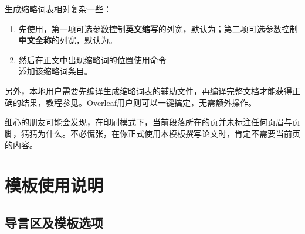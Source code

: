 \documentclass[print, promaster, vlined]{DissertUESTC}
\begin{document}
	
	
	\printnomenclature
	
	生成缩略词表相对复杂一些：
	\begin{enumerate}
		\item 先使用，第一项可选参数控制\textbf{英文缩写}的列宽，默认为\shad{5em}；第二项可选参数控制\textbf{中文全称}的列宽，默认为\shad{7.5em}。
		
		\item 然后在正文中出现缩略词的位置使用命令\\添加该缩略词条目。
	\end{enumerate}
	
	另外，本地用户需要先编译生成缩略词表的辅助文件，再编译完整文档才能获得正确的结果，教程参见\href{https://zhuanlan.zhihu.com/p/46442713}{}。Overleaf用户则可以一键搞定，无需额外操作。
	
	细心的朋友可能会发现，在印刷模式下，当前段落所在的页并未标注任何页眉与页脚，猜猜为什么。不必慌张，在你正式使用本模板撰写论文时，肯定不需要当前页的内容。
	
	\chapter{模板使用说明}
	
	\section{导言区及模板选项}
\end{document}
